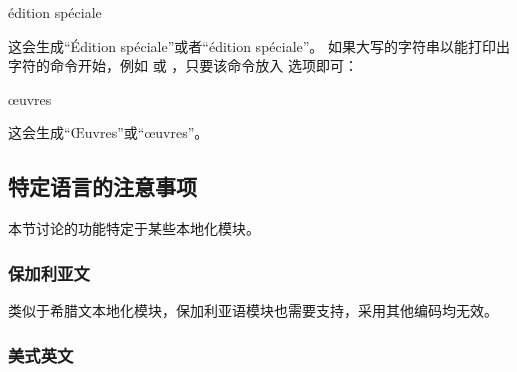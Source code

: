 \begin{ltxsyntax}
\begin{ltxexample}
\autocap{\'e}dition sp\'eciale
\end{ltxexample}
%
这会生成“Édition spéciale”或者“édition spéciale”。
如果大写的字符串以能打印出字符的命令开始，例如  或 ，只要该命令放入  选项即可：

\begin{ltxexample}
\autocap{\oe}uvres
\end{ltxexample}
%
这会生成“Œuvres”或“œuvres”。

\end{ltxsyntax}

\subsection[关于语言的注意事项]{特定语言的注意事项}%
\label{use:loc}

本节讨论的功能特定于某些本地化模块。

\subsubsection{保加利亚文}
\label{use:loc:bul}

类似于希腊文本地化模块，保加利亚语模块也需要\utf 支持，采用其他编码均无效。

\subsubsection{美式英文}
\label{use:loc:us}

